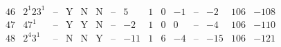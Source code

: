\documentclass[11pt,reqno,a4letter]{article}
\numberwithin{figure}{section}
\numberwithin{table}{section}
\theoremstyle{plain}
\numberwithin{theorem}{section}
\theoremstyle{definition}
\begin{document}
\begin{table}[h!]
\begin{equation*}
{\begin{array}{|cc|c|ccc|c|c|ccc|c|ccc}
 46 & 2^1 23^1 & \text{--} & \text{Y} & \text{N} & \text{N} & \text{--} & 5 & 1 & 0 & -1 & \text{--} & -2 & 106 & -108 \\
 47 & 47^1 & \text{--} & \text{Y} & \text{Y} & \text{N} & \text{--} & -2 & 1 & 0 & 0 & \text{--} & -4 & 106 & -110 \\
 48 & 2^4 3^1 & \text{--} & \text{N} & \text{N} & \text{Y} & \text{--} & -11 & 1 & 6 & -4 & \text{--} & -15 & 106 & -121 \\

\end{array}}
\end{equation*}
\end{table}
\end{document}
